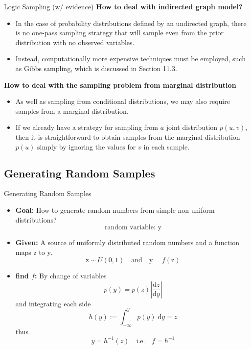 \documentclass{bredelebeamer}
\begin{document}
\begin{frame}{Logic Sampling (w/ evidence)}
  \textbf{How to deal with indirected graph model?} \\
  \begin{itemize}
    \item In the case of probability distributions defined by an undirected
    graph, there is no one-pass sampling strategy that will sample even from
    the prior distribution with no observed variables.
    \item Instead, computationally more expensive techniques must be employed,
    such as Gibbs sampling, which is discussed in Section 11.3.
  \end{itemize}
  \textbf{How to deal with the sampling problem from marginal distribution}
  \begin{itemize}
    \item As well as sampling from conditional distributions, we may also
    require samples from a marginal distribution.
    \item If we already have a strategy for sampling from $a$ joint distribution
    $p(u, v)$, then it is straightforward to obtain samples from the marginal
    distribution $p(u)$ simply by ignoring the values for $v$ in each sample.
  \end{itemize}
\end{frame}

\subsection{Generating Random Samples}
\begin{frame}{Generating Random Samples}
  \begin{itemize}
    \item \textbf{Goal:} How to generate random numbers from simple non-uniform
    distributions?
    \begin{equation}
      \textrm{random variable: } \mathrm{y}
    \end{equation}
    \item \textbf{Given:} A source of uniformly distributed random numbers and
    a function maps $\mathrm{z}$ to $\mathrm{y}$.
    \begin{equation}
      \mathrm{z} \sim U(0,1) \quad \textrm{and} \quad \textrm{y} = f(\textrm{z})
    \end{equation}
    \item \textbf{find $f$:} By change of variables
    \begin{equation}
      p(y) = p(z) \left|\frac{\mathrm{d}z}{\mathrm{d}y}\right|
    \end{equation}
    and integrating each side
    \begin{equation}
      h(y) := \int_{-\infty}^{y} p(y) \;\mathrm{d}y = z
    \end{equation}
    thus
    \begin{equation}
      y = h^{-1}(z) \quad \textrm{i.e.} \quad f = h^{-1}
    \end{equation}
  \end{itemize}


\end{frame}
\end{document}
